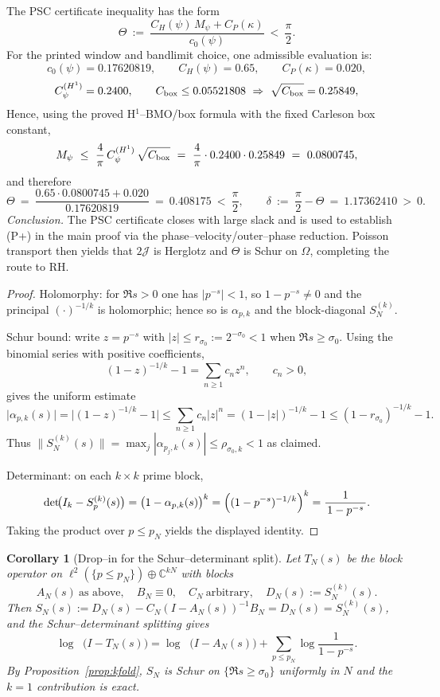 \documentclass[11pt]{article}
\providecommand{\Mpsilocked}{0.0800745}%
\newtheorem{corollary}[theorem]{Corollary}
\theoremstyle{definition}
\theoremstyle{remark}
\newcommand{\C}{\mathbb{C}}
\DeclareMathOperator{\dettwo}{det_2}
\begin{document}
The PSC certificate inequality has the form
\[
\Theta\ :=\ \frac{C_H(\psi)\,M_\psi + C_P(\kappa)}{c_0(\psi)}\ <\ \frac{\pi}{2}.
\]
For the printed window and bandlimit choice, one admissible evaluation is:
\[
c_0(\psi)=0.17620819,\qquad C_H(\psi)=0.65,\qquad C_P(\kappa)=0.020,
\]
\[
C_\psi^{(H^1)}=0.2400,\qquad C_{\rm box}\le 0.05521808\ \Rightarrow\ \sqrt{C_{\rm box}}=0.25849,
\]
Hence, using the proved H$^1$--BMO/box formula with the fixed Carleson box constant,
\[
M_\psi\ \le\ \frac{4}{\pi}\,C_\psi^{(H^1)}\,\sqrt{C_{\rm box}}\ =\ \frac{4}{\pi}\cdot 0.2400 \cdot 0.25849\ =\ \Mpsilocked,
\]
and therefore
\[
\Theta\ =\ \frac{0.65\cdot \Mpsilocked + 0.020}{0.17620819}\ =\ 0.408175\ <\ \frac{\pi}{2},\qquad
\delta\ :=\ \frac{\pi}{2}-\Theta\ =\ 1.17362410\ >\ 0.
\]
\emph{Conclusion.} The PSC certificate closes with large slack and is used to establish (P+) in the main proof via the phase--velocity/outer--phase reduction. Poisson transport then yields that $2\mathcal J$ is Herglotz and $\Theta$ is Schur on $\Omega$, completing the route to RH.
\begin{proof}
Holomorphy: for $\Re s>0$ one has $|p^{-s}|<1$, so $1-p^{-s}\neq 0$ and the principal $(\cdot)^{-1/k}$ is holomorphic; hence so is $\alpha_{p,k}$ and the block-diagonal $S_{N}^{(k)}$.

Schur bound: write $z=p^{-s}$ with $|z|\le r_{\sigma_0}:=2^{-\sigma_0}<1$ when $\Re s\ge \sigma_0$. Using the binomial series with positive coefficients,
\[
 (1-z)^{-1/k}-1=\sum_{n\ge 1} c_n z^n,\qquad c_n>0,
\]
gives the uniform estimate
\[
 \bigl|\alpha_{p,k}(s)\bigr|=\bigl|(1-z)^{-1/k}-1\bigr|\le \sum_{n\ge 1} c_n |z|^n
= (1-|z|)^{-1/k}-1 \le (1-r_{\sigma_0})^{-1/k}-1.
\]
Thus $\|S_{N}^{(k)}(s)\|=\max_{j}|\alpha_{p_j,k}(s)|\le \rho_{\sigma_0,k}<1$ as claimed.

Determinant: on each $k\times k$ prime block,
\[
 \det\!\bigl(I_k-S_{p}^{(k)}(s)\bigr)=\bigl(1-\alpha_{p,k}(s)\bigr)^{k}=\Bigl((1-p^{-s})^{-1/k}\Bigr)^{k}=\frac{1}{\,1-p^{-s}\,}.
\]
Taking the product over $p\le p_N$ yields the displayed identity.
\end{proof}
\begin{corollary}[Drop--in for the Schur--determinant split]
\label{cor:dropin}
Let $T_N(s)$ be the block operator on $\ell^2(\{p\le p_N\})\oplus\C^{kN}$ with blocks
\[
 A_N(s)\ \text{as above},\quad B_N\equiv 0,\quad C_N\ \text{arbitrary},\quad D_N(s):=S_{N}^{(k)}(s).
\]
Then $S_N(s):=D_N(s)-C_N(I-A_N(s))^{-1}B_N=D_N(s)=S_{N}^{(k)}(s)$, and the Schur--determinant splitting gives
\[
 \log\dettwo\bigl(I-T_N(s)\bigl)=\log\dettwo\bigl(I-A_N(s)\bigr)+\sum_{p\le p_N}\log\!\frac{1}{1-p^{-s}}.
\]
By Proposition~\ref{prop:kfold}, $S_N$ is Schur on $\{\Re s\ge \sigma_0\}$ uniformly in $N$ and the $k=1$ contribution is exact.
\end{corollary}
\end{document}
